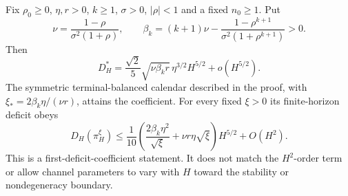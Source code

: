 \begin{theorem}\label{thm:ar1-sharp}
Fix $\rho_0\ge0$, $\eta,r>0$, $k\ge1$, $\sigma>0$, $|\rho|<1$ and a fixed
$n_0\ge1$. Put
\begin{equation}\label{eq:ar1-nu-beta}
 \nu=\frac{1-\rho}{\sigma^2(1+\rho)},\qquad
 \beta_k=(k+1)\nu-\frac{1-\rho^{k+1}}{\sigma^2(1+\rho^{k+1})}>0.
\end{equation}
Then
\begin{equation}\label{eq:ar1-main}
 D_H^*=\frac{\sqrt2}{5}\sqrt{\nu\beta_k r}\,\eta^{3/2}H^{5/2}
 +o(H^{5/2}).
\end{equation}
The symmetric terminal-balanced calendar described in the proof, with
$\xi_*=2\beta_k\eta/(\nu r)$, attains the coefficient.
For every fixed $\xi>0$ its finite-horizon deficit obeys
\begin{equation}\label{eq:ar1-calendar-upper}
 D_H(\pi_H^\xi)\le\frac1{10}
 \left(\frac{2\beta_k\eta^2}{\sqrt\xi}+\nu r\eta\sqrt\xi\right)H^{5/2}
 +O(H^2).
\end{equation}
This is a first-deficit-coefficient statement. It does not match the
$H^2$-order term or allow channel parameters to vary with $H$ toward the
stability or nondegeneracy boundary.
\end{theorem}

